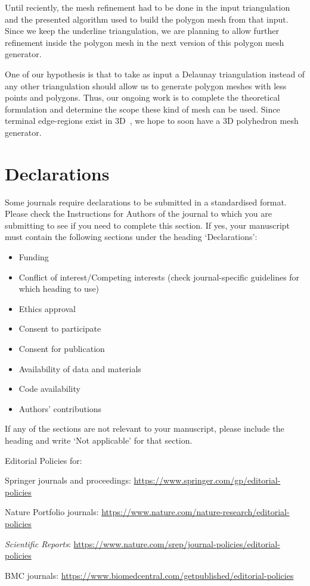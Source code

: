 \documentclass[pdflatex,sn-mathphys]{sn-jnl}%
\theoremstyle{thmstyleone}%
\theoremstyle{thmstyletwo}%
\theoremstyle{thmstylethree}%
\begin{document}
Until reciently, the mesh refinement had to be done in the input triangulation and the presented algorithm used to build the polygon mesh from that input. Since we keep the underline triangulation, we are planning to allow further refinement inside the polygon mesh in the next version of this polygon mesh generator. 

One of our hypothesis is that to take as input a Delaunay triangulation instead of any other triangulation should allow us to generate polygon meshes with less points and polygons. Thus,  our ongoing work is to complete the theoretical formulation and determine the scope these kind of mesh can be used. Since terminal edge-regions exist in 3D~\cite{HerviasHCF13}, we hope to soon have  a 3D polyhedron mesh generator.

\section*{Declarations}

Some journals require declarations to be submitted in a standardised format. Please check the Instructions for Authors of the journal to which you are submitting to see if you need to complete this section. If yes, your manuscript must contain the following sections under the heading `Declarations':

\begin{itemize}
\item Funding
\item Conflict of interest/Competing interests (check journal-specific guidelines for which heading to use)
\item Ethics approval 
\item Consent to participate
\item Consent for publication
\item Availability of data and materials
\item Code availability 
\item Authors' contributions
\end{itemize}

\noindent
If any of the sections are not relevant to your manuscript, please include the heading and write `Not applicable' for that section. 

\bigskip
\begin{flushleft}%
Editorial Policies for:

\bigskip\noindent
Springer journals and proceedings: \url{https://www.springer.com/gp/editorial-policies}

\bigskip\noindent
Nature Portfolio journals: \url{https://www.nature.com/nature-research/editorial-policies}

\bigskip\noindent
\textit{Scientific Reports}: \url{https://www.nature.com/srep/journal-policies/editorial-policies}

\bigskip\noindent
BMC journals: \url{https://www.biomedcentral.com/getpublished/editorial-policies}
\end{flushleft}
\end{document}
